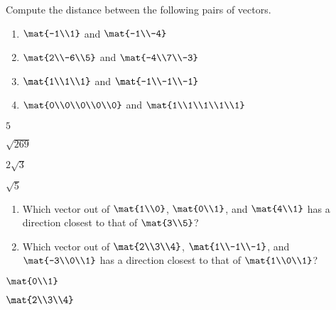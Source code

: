 \begin{exercises}
\begin{problist}
		\prob Compute the distance between the following pairs of vectors.
		\begin{enumerate}
			\item $\mat{-1\\1}$ and $\mat{-1\\-4}$
			\item $\mat{2\\-6\\5}$ and $\mat{-4\\7\\-3}$
			\item $\mat{1\\1\\1}$ and $\mat{-1\\-1\\-1}$
			\item $\mat{0\\0\\0\\0\\0}$ and $\mat{1\\1\\1\\1\\1}$
		\end{enumerate}
		\begin{solution}
			\begin{enumerate*}
				\item $5$ 
				\item $\sqrt{269}$ 
				\item $2\sqrt{3}$ 
				\item $\sqrt{5}$ 
			\end{enumerate*}
		\end{solution}
		
		\prob
		\begin{enumerate}
			\item Which vector out of $\mat{1\\0}$, $\mat{0\\1}$, and $\mat{4\\1}$
			has a direction closest to that of $\mat{3\\5}$?
			\item Which vector out of $\mat{2\\3\\4}$, $\mat{1\\-1\\-1}$, and $\mat{-3\\0\\1}$
			has a direction closest to that of $\mat{1\\0\\1}$?
		\end{enumerate}
		\begin{solution}
			\begin{enumerate*}
				\item $\mat{0\\1}$ 
				\item $\mat{2\\3\\4}$
			\end{enumerate*}
		\end{solution}
		

\end{problist}
\end{exercises}
